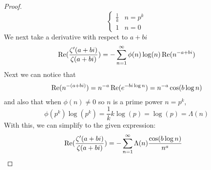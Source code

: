 \documentclass{homework}
\begin{document}
\begin{proof}
\[\begin{cases}
                                                                                                  \frac{1}{k} & n= p^k\\
                                                                                                  1 & n = 0
                                                                                                  \end{cases}
                                                                                                  \]
                                                                                                  We next take a derivative with respect to $a+bi$
                                                                                                  \[
                                                                                                  \operatorname{Re}(\frac{\zeta'(a+bi)}{\zeta(a+bi)}) = -\sum_{n=1}^\infty \phi(n)\log(n)\operatorname{Re}(n^{-a+bi})
                                                                                                  \]
                                                                                                  Next we can notice that
                                                                                                  \begin{align}\label{n_to_a+bi_expansion}
                                                                                                      \operatorname{Re}(n^{-(a+bi)}) = n^{-a}\operatorname{Re}(e^{-bi\log n}) = n^{-a}\cos(b\log n)
                                                                                                      \end{align}
                                                                                                      and also that when $\phi(n)\neq 0$ so $n$ is a prime power $n=p^k$,
                                                                                                      \[
                                                                                                      \phi(p^k)\log(p^k) = \frac{1}{k}k\log(p) = \log(p) = \Lambda(n)
                                                                                                      \]
                                                                                                      With this, we can simplify to the given expression:
                                                                                                      \begin{align*}
                                                                                                      \operatorname{Re}(\frac{\zeta'(a+bi)}{\zeta(a+bi)}) &= -\sum_{n=1}^\infty \Lambda(n)\frac{\cos(b\log n)}{n^{a}}
                                                                                                      \end{align*}
                                                                                                      \end{proof}
\end{document}
